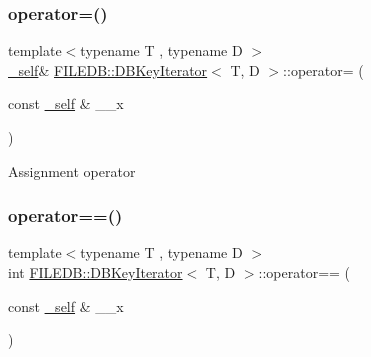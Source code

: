\subsubsection{\texorpdfstring{operator=()}{operator=()}\hspace{0.1cm}{\footnotesize\ttfamily [3/3]}}
{\footnotesize\ttfamily template$<$typename T , typename D $>$ \\
\mbox{\hyperlink{classFILEDB_1_1DBKeyIterator_aaf7773c7a848ec6e04bc738dd794ace1}{\+\_\+self}}\& \mbox{\hyperlink{classFILEDB_1_1DBKeyIterator}{F\+I\+L\+E\+D\+B\+::\+D\+B\+Key\+Iterator}}$<$ T, D $>$\+::operator= (\begin{DoxyParamCaption}\item[{const \mbox{\hyperlink{classFILEDB_1_1DBKeyIterator_aaf7773c7a848ec6e04bc738dd794ace1}{\+\_\+self}} \&}]{\+\_\+\+\_\+x }\end{DoxyParamCaption})\hspace{0.3cm}{\ttfamily [inline]}}

Assignment operator \mbox{\label{classFILEDB_1_1DBKeyIterator_ab6d1aad1d07c4ee9a1edeadf6610c6f4}} 
\subsubsection{\texorpdfstring{operator==()}{operator==()}\hspace{0.1cm}{\footnotesize\ttfamily [1/3]}}
{\footnotesize\ttfamily template$<$typename T , typename D $>$ \\
int \mbox{\hyperlink{classFILEDB_1_1DBKeyIterator}{F\+I\+L\+E\+D\+B\+::\+D\+B\+Key\+Iterator}}$<$ T, D $>$\+::operator== (\begin{DoxyParamCaption}\item[{const \mbox{\hyperlink{classFILEDB_1_1DBKeyIterator_aaf7773c7a848ec6e04bc738dd794ace1}{\+\_\+self}} \&}]{\+\_\+\+\_\+x }\end{DoxyParamCaption})\hspace{0.3cm}{\ttfamily [inline]}}

